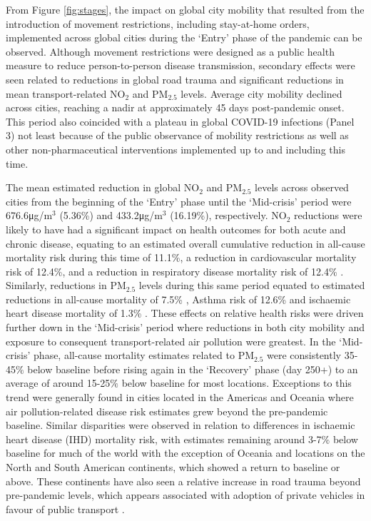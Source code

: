 \documentclass[preprint,10pt]{elsarticle} %
\begin{document}
From Figure \ref{fig:stages}, the impact on global city mobility that resulted from the introduction of movement restrictions, including stay-at-home orders, implemented across global cities during the `Entry' phase\cite{hale2021global} of the pandemic can be observed. Although movement restrictions were designed as a public health measure to reduce person-to-person disease transmission, secondary effects were seen related to reductions in global road trauma \cite{ITFRS2023} and significant reductions in mean transport-related NO$_{2}$ and PM$_{2.5}$ levels\cite{zhang2023impact}. Average city mobility declined across cities, reaching a nadir at approximately 45 days post-pandemic onset. This period also coincided with a plateau in global COVID-19 infections (Panel 3) not least because of the public observance of mobility restrictions as well as other non-pharmaceutical interventions implemented up to and including this time\cite{hale2021global}. 

The mean estimated reduction in global NO$_{2}$ and PM$_{2.5}$ levels across observed cities from the beginning of the `Entry' phase until the `Mid-crisis' period were 676.6\si{\micro\gram}/m$^{3}$ (5.36\%) and 433.2\si{\micro\gram}/m$^{3}$ (16.19\%), respectively. NO$_{2}$ reductions were likely to have had a significant impact on health outcomes for both acute and chronic disease, equating to an estimated overall cumulative reduction in all-cause mortality risk during this time of 11.1\%, a reduction in cardiovascular mortality risk of 12.4\%, and a reduction in respiratory disease mortality risk of 12.4\% \cite{Huang19Pollution}. Similarly, reductions in PM$_{2.5}$ levels during this same period equated to estimated reductions in all-cause mortality of 7.5\% \cite{Yu2020PM2.5}, Asthma risk of 12.6\% and ischaemic heart disease mortality of 1.3\% \cite{Xie257}. These effects on relative health risks were driven further down in the `Mid-crisis' period where reductions in both city mobility and exposure to consequent transport-related air pollution were greatest. In the `Mid-crisis' phase, all-cause mortality estimates related to PM$_{2.5}$ were consistently 35-45$\%$ below baseline before rising again in the `Recovery' phase (day 250+) to an average of around 15-25$\%$ below baseline for most locations. Exceptions to this trend were generally found in cities located in the Americas and Oceania where air pollution-related disease risk estimates grew beyond the pre-pandemic baseline. Similar disparities were observed in relation to differences in ischaemic heart disease (IHD) mortality risk, with estimates remaining around 3-7$\%$ below baseline for much of the world with the exception of Oceania and locations on the North and South American continents, which showed a return to baseline or above. These continents have also seen a relative increase in road trauma beyond pre-pandemic levels, which appears associated with adoption of private vehicles in favour of public transport \cite{ITFRS2023,saladie2023back,DAS20211}. 
\end{document}
